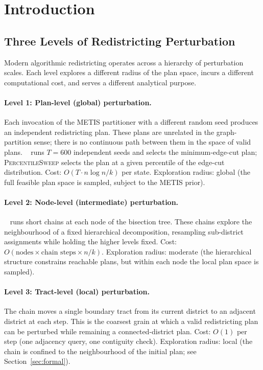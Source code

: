 \section{Introduction}
\label{sec:introduction}

\subsection{Three Levels of Redistricting Perturbation}

Modern algorithmic redistricting operates across a hierarchy of perturbation
scales.
Each level explores a different radius of the plan space, incurs a different
computational cost, and serves a different analytical purpose.

\paragraph{Level 1: Plan-level (global) perturbation.}
Each invocation of the METIS partitioner with a different random seed produces
an independent redistricting plan.
These plans are unrelated in the graph-partition sense; there is no continuous
path between them in the space of valid plans.
\cs{}~\citep{b11paper} runs $T = 600$ independent seeds and selects the
minimum-edge-cut plan; \textsc{PercentileSweep} selects the plan at a given
percentile of the edge-cut distribution.
Cost: $O(T \cdot n \log n / k)$ per state.
Exploration radius: global (the full feasible plan space is sampled, subject
to the METIS prior).

\paragraph{Level 2: Node-level (intermediate) perturbation.}
\be{}~\citep{h1paper} runs short \recom{} chains at each node of the
bisection tree.
These chains explore the neighbourhood of a fixed hierarchical decomposition,
resampling sub-district assignments while holding the higher levels fixed.
Cost: $O(\text{nodes} \times \text{chain steps} \times n/k)$.
Exploration radius: moderate (the hierarchical structure constrains reachable
plans, but within each node the local plan space is sampled).

\paragraph{Level 3: Tract-level (local) perturbation.}
The \flip{} chain moves a single boundary tract from its current district to
an adjacent district at each step.
This is the coarsest grain at which a valid redistricting plan can be perturbed
while remaining a connected-district plan.
Cost: $O(1)$ per step (one adjacency query, one contiguity check).
Exploration radius: local (the chain is confined to the neighbourhood of
the initial plan; see Section~\ref{sec:formal}).

